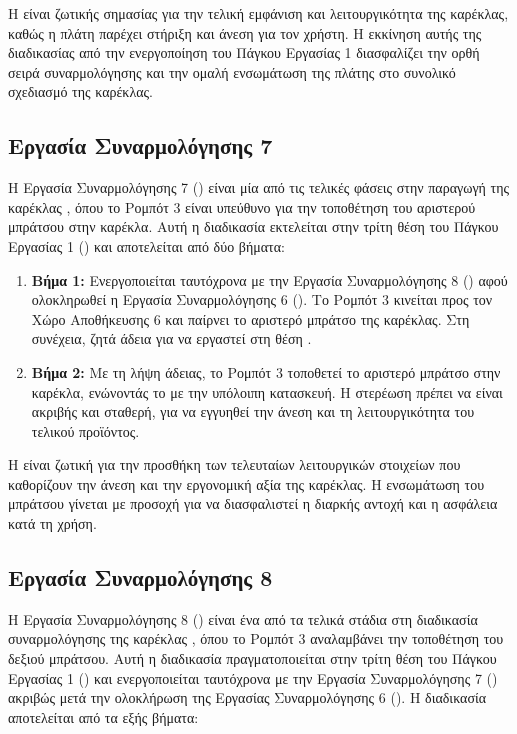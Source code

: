 Η  είναι ζωτικής σημασίας για την τελική εμφάνιση και λειτουργικότητα της καρέκλας, καθώς η πλάτη παρέχει στήριξη και άνεση για τον χρήστη. Η εκκίνηση αυτής της διαδικασίας από την ενεργοποίηση του Πάγκου Εργασίας 1 διασφαλίζει την ορθή σειρά συναρμολόγησης και την ομαλή ενσωμάτωση της πλάτης στο συνολικό σχεδιασμό της καρέκλας.

\subsection{Εργασία Συναρμολόγησης 7}
\noindent Η Εργασία Συναρμολόγησης 7 () είναι μία από τις τελικές φάσεις στην παραγωγή της καρέκλας , όπου το Ρομπότ 3 είναι υπεύθυνο για την τοποθέτηση του αριστερού μπράτσου στην καρέκλα. Αυτή η διαδικασία εκτελείται στην τρίτη θέση του Πάγκου Εργασίας 1 () και αποτελείται από δύο βήματα:

\begin{enumerate}
  \item \textbf{Βήμα 1:} Ενεργοποιείται ταυτόχρονα με την Εργασία Συναρμολόγησης 8 () αφού ολοκληρωθεί η Εργασία Συναρμολόγησης 6 (). Το Ρομπότ 3 κινείται προς τον Χώρο Αποθήκευσης 6 και παίρνει το αριστερό μπράτσο της καρέκλας. Στη συνέχεια, ζητά άδεια για να εργαστεί στη θέση .
  \item \textbf{Βήμα 2:} Με τη λήψη άδειας, το Ρομπότ 3 τοποθετεί το αριστερό μπράτσο στην καρέκλα, ενώνοντάς το με την υπόλοιπη κατασκευή. Η στερέωση πρέπει να είναι ακριβής και σταθερή, για να εγγυηθεί την άνεση και τη λειτουργικότητα του τελικού προϊόντος.
\end{enumerate}

Η  είναι ζωτική για την προσθήκη των τελευταίων λειτουργικών στοιχείων που καθορίζουν την άνεση και την εργονομική αξία της καρέκλας. Η ενσωμάτωση του μπράτσου γίνεται με προσοχή για να διασφαλιστεί η διαρκής αντοχή και η ασφάλεια κατά τη χρήση.

\subsection{Εργασία Συναρμολόγησης 8}
\noindent Η Εργασία Συναρμολόγησης 8 () είναι ένα από τα τελικά στάδια στη διαδικασία συναρμολόγησης της καρέκλας , όπου το Ρομπότ 3 αναλαμβάνει την τοποθέτηση του δεξιού μπράτσου. Αυτή η διαδικασία πραγματοποιείται στην τρίτη θέση του Πάγκου Εργασίας 1 () και ενεργοποιείται ταυτόχρονα με την Εργασία Συναρμολόγησης 7 () ακριβώς μετά την ολοκλήρωση της Εργασίας Συναρμολόγησης 6 (). Η διαδικασία  αποτελείται από τα εξής βήματα:

